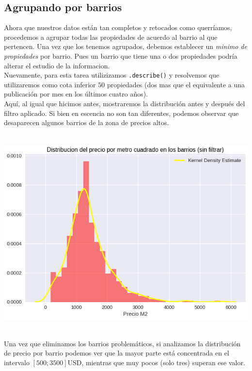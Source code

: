 \documentclass[a4paper, 10pt]{article}
\def\code#1{\texttt{#1}}
\newcommand\tab[1][0.5cm]{\hspace*{#1}}
\begin{document}
			\subsection{Agrupando por barrios}
				Ahora que nuestros datos están tan completos y retocados como querríamos, procedemos a agrupar todas las propiedades
				de acuerdo al barrio al que pertencen. Una vez que los tenemos agrupados, debemos establecer un \emph{minimo de
				propiedades} por barrio. Pues un barrio que tiene una o dos propiedades podría alterar el estudio de la
				informacion. \\
				\tab Nuevamente, para esta tarea utilizizamos \code{.describe()} y resolvemos que utilizaremos como cota inferior
				$50$ propiedades (dos mas que el equivalente a una publicación por mes en los últimos cuatro años). \\
				\tab Aquí, al igual que hicimos antes, mostraremos la distribución antes y después del filtro aplicado. Si bien
				en escencia no son tan diferentes, podemos observar que desaparecen algunos barrios de la zona de precios altos.
				\begin{center}
       				\includegraphics[width=6in, height=4.2in]{images/m2HoodUnfilteredKDE}
		   		\end{center}
				\tab Una vez que eliminamos los barrios problemáticos, si analizamos la distribución de precio por barrio
				podemos ver que la mayor parte está concentrada en el intervalo $[500;3500]$USD, mientras que muy pocos
				(solo tres) superan ese valor.
\end{document}
